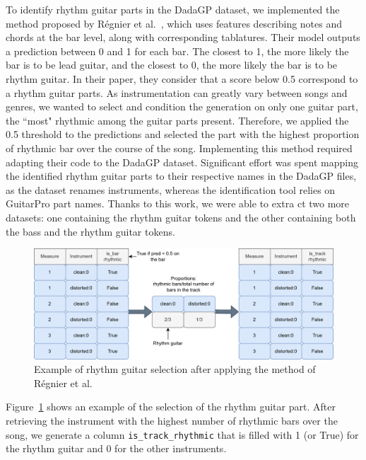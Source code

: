 To identify rhythm guitar parts in the DadaGP dataset, we implemented the method proposed by Régnier et al.~\cite{regnier_identification_2021},
which uses features describing notes and chords at the bar level, along with corresponding tablatures.
Their model outputs a prediction between 0 and 1 for each bar. The closest to 1, the more likely the bar is to be lead guitar, and the closest to 0, the more likely the bar is to be rhythm guitar.
In their paper, they consider that a score below 0.5 correspond to a rhythm guitar parts.
As instrumentation can greatly vary between songs and genres, we wanted to select and condition the generation on only one guitar part, the ``most" rhythmic among the guitar parts present.
Therefore, we applied the 0.5 threshold to the predictions and selected the part with the highest proportion of rhythmic bar over the course of the song.
Implementing this method required adapting their code to the DadaGP dataset.
Significant effort was spent mapping the identified rhythm guitar parts to their respective names in the DadaGP files, as the dataset renames instruments, whereas the identification tool relies on GuitarPro part names.
Thanks to this work, we were able to extra  ct two more datasets: one containing the rhythm guitar tokens and the other containing both the bass and the rhythm guitar tokens.

\begin{figure}[!ht]
    \centering
    \includegraphics[width=0.8\linewidth]{../images-figures/rhythm_guitar_selection.png}
    \caption{Example of rhythm guitar selection after applying the method of Régnier et al.}
    \label{fig:rhythm_guitar_selection}
\end{figure}

Figure~\ref{fig:rhythm_guitar_selection} shows an example of the selection of the rhythm guitar part.
After retrieving the instrument with the highest number of rhythmic bars over the song,
we generate a column \texttt{is\_track\_rhythmic} that is filled with 1 (or True) for the rhythm guitar and 0 for the other instruments.


